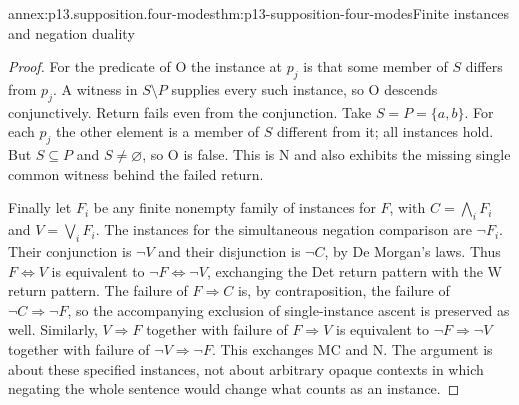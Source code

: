 \begin{annexitem}{annex:p13.supposition.four-modes}{thm:p13-supposition-four-modes}{Finite instances and negation duality}
\begin{proof}
For the predicate of O the instance at \(p_j\) is that some member
of \(S\) differs from \(p_j\). A witness in \(S\setminus P\)
supplies every such instance, so O descends conjunctively. Return
fails even from the conjunction. Take \(S=P=\{a,b\}\). For each
\(p_j\) the other element is a member of \(S\) different from it;
all instances hold. But \(S\subseteq P\) and \(S\ne\varnothing\),
so O is false. This is N and also exhibits the missing single common
witness behind the failed return.

Finally let \(F_i\) be any finite nonempty family of instances for
\(F\), with \(C=\bigwedge_iF_i\) and
\(V=\bigvee_iF_i\). The instances for the simultaneous negation
comparison are \(\neg F_i\). Their conjunction is \(\neg V\)
and their disjunction is \(\neg C\), by De Morgan's laws. Thus
\(F\Leftrightarrow V\) is equivalent to
\(\neg F\Leftrightarrow\neg V\), exchanging the Det return
pattern with the W return pattern. The failure of \(F\Rightarrow C\)
is, by contraposition, the failure of
\(\neg C\Rightarrow\neg F\), so the accompanying exclusion
of single-instance ascent is preserved as well. Similarly,
\(V\Rightarrow F\) together with failure of
\(F\Rightarrow V\) is equivalent to
\(\neg F\Rightarrow\neg V\) together with failure of
\(\neg V\Rightarrow\neg F\). This exchanges MC and N.
The argument is about these specified instances, not about arbitrary
opaque contexts in which negating the whole sentence would change
what counts as an instance.
\end{proof}
\end{annexitem}

